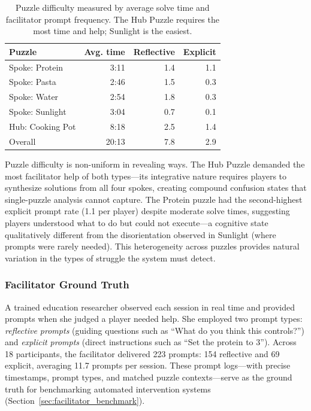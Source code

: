 \begin{table}[t]
\centering
\caption{Puzzle difficulty measured by average solve time and facilitator prompt frequency. The Hub Puzzle requires the most time and help; Sunlight is the easiest.}
\label{tab:puzzle_difficulty}
\small
\begin{tabular}{lrrr}
\toprule
\textbf{Puzzle} & \textbf{Avg. time} & \textbf{Reflective} & \textbf{Explicit} \\
\midrule
Spoke: Protein       & 3:11 & 1.4 & 1.1 \\
Spoke: Pasta         & 2:46 & 1.5 & 0.3 \\
Spoke: Water         & 2:54 & 1.8 & 0.3 \\
Spoke: Sunlight      & 3:04 & 0.7 & 0.1 \\
Hub: Cooking Pot     & 8:18 & 2.5 & 1.4 \\
\midrule
Overall              & 20:13 & 7.8 & 2.9 \\
\bottomrule
\end{tabular}
\end{table}

Puzzle difficulty is non-uniform in revealing ways. The Hub Puzzle demanded the most facilitator help of both types---its integrative nature requires players to synthesize solutions from all four spokes, creating compound confusion states that single-puzzle analysis cannot capture. The Protein puzzle had the second-highest explicit prompt rate (1.1 per player) despite moderate solve times, suggesting players understood what to do but could not execute---a cognitive state qualitatively different from the disorientation observed in Sunlight (where prompts were rarely needed). This heterogeneity across puzzles provides natural variation in the types of struggle the system must detect.

\subsubsection{Facilitator Ground Truth}

A trained education researcher observed each session in real time and provided prompts when she judged a player needed help. She employed two prompt types: \emph{reflective prompts} (guiding questions such as ``What do you think this controls?'') and \emph{explicit prompts} (direct instructions such as ``Set the protein to 3''). Across 18 participants, the facilitator delivered 223 prompts: 154 reflective and 69 explicit, averaging 11.7 prompts per session. These prompt logs---with precise timestamps, prompt types, and matched puzzle contexts---serve as the ground truth for benchmarking automated intervention systems (Section~\ref{sec:facilitator_benchmark}).


